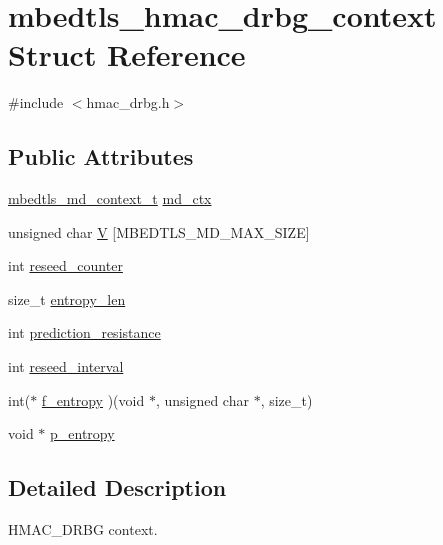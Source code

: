\hypertarget{structmbedtls__hmac__drbg__context}{\section{mbedtls\-\_\-hmac\-\_\-drbg\-\_\-context Struct Reference}
\label{structmbedtls__hmac__drbg__context}
}


{\ttfamily \#include $<$hmac\-\_\-drbg.\-h$>$}

\subsection*{Public Attributes}
\begin{DoxyCompactItemize}
\item 
\hyperlink{structmbedtls__md__context__t}{mbedtls\-\_\-md\-\_\-context\-\_\-t} \hyperlink{structmbedtls__hmac__drbg__context_ae5ab42fe02b5f9d26c5b4535e3614a4d}{md\-\_\-ctx}
\item 
unsigned char \hyperlink{structmbedtls__hmac__drbg__context_a3e426c343012174c037a462535d23715}{V} \mbox{[}M\-B\-E\-D\-T\-L\-S\-\_\-\-M\-D\-\_\-\-M\-A\-X\-\_\-\-S\-I\-Z\-E\mbox{]}
\item 
int \hyperlink{structmbedtls__hmac__drbg__context_a3bdabbbda4d50c954907f5db1f8cecaf}{reseed\-\_\-counter}
\item 
size\-\_\-t \hyperlink{structmbedtls__hmac__drbg__context_a137d68a6581248a2a6fbe06dae4a830b}{entropy\-\_\-len}
\item 
int \hyperlink{structmbedtls__hmac__drbg__context_a2c486e648011f32883056541249f7a80}{prediction\-\_\-resistance}
\item 
int \hyperlink{structmbedtls__hmac__drbg__context_aa69d31aabb0c213dd5f3ea38b8f3f1ad}{reseed\-\_\-interval}
\item 
int($\ast$ \hyperlink{structmbedtls__hmac__drbg__context_a8d1372acc13224e983b2e73a8fde9f64}{f\-\_\-entropy} )(void $\ast$, unsigned char $\ast$, size\-\_\-t)
\item 
void $\ast$ \hyperlink{structmbedtls__hmac__drbg__context_a218d146b662c9795b9f05b94fa482790}{p\-\_\-entropy}
\end{DoxyCompactItemize}


\subsection{Detailed Description}
H\-M\-A\-C\-\_\-\-D\-R\-B\-G context. 

